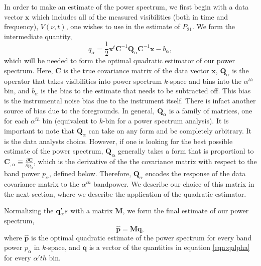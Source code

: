 \documentclass[twocolumn,numberedappendix]{emulateapj} \shorttitle{PSA64}
\newcommand{\x}{\mathbf{x}} \newcommand{\xhat}{\hat{\mathbf{x}}}
\begin{document}
In order to make an estimate of the power spectrum, we first begin with a data
vector $\x$ which includes all of the measured  visibilities (both in time and
frequency), $V(\nu,t)$, one wishes to use in the estimate of $P_{21}$. We form
the intermediate quantity,
\begin{equation}
\label{eqn:qalpha}
    q_{\alpha} = \frac{1}{2}\x^{t}\mathbf{C}^{-1}\mathbf{Q}_{\alpha}\mathbf{C}^{-1}\x - b_{\alpha},
\end{equation}
which will be needed to form the optimal quadratic estimator of our power spectrum.
Here, $\mathbf{C}$ is the true covariance matrix of the data vector $\x$, 
$\mathbf{Q}_{\alpha}$ is the operator that takes visibilities into power spectrum
$k$-space and bins into the ${\alpha}^{th}$ bin, and $b_{\alpha}$ is the bias to
the estimate that needs to be subtracted off. This bias is the instrumental
noise bias due to the instrument itself. There is infact another source of bias
due to the foregrounds. In general, $\mathbf{Q}_{\alpha}$
is a family of matrices, one for each $\alpha^{th}$ bin (equivalent to $k$-bin
for a power spectrum analysis). It is important to note that
$\mathbf{Q}_{\alpha}$ can take on any form and be completely arbitrary. It is
the data analysts choice. However, if one is looking for the best possible
estimate of the power spectrum,  $\mathbf{Q_{\alpha}}$ generally
takes a form that is proportionl to  $\mathbf{C}_{,\alpha} \equiv
\frac{\partial{\mathbf{C}}}{\partial p_{\alpha}}$, which is the derivative of
the the covariance matrix with respect to the band power $p_{\alpha}$, defined
below.  Therefore, $\mathbf{Q}_{\alpha}$ encodes the response of the data
covariance matrix to the $\alpha^{th}$ bandpower. We describe our choice of this
matrix in the next section, where we describe the application of the quadratic
estimator. 

Normalizing the $\mathbf{q}_{\alpha}'s$ with a matrix $\mathbf{M}$, we form
the final estimate of our power spectrum,
\begin{equation}\label{eqn:pspec_norm}
    \mathbf{\hat{p}} = \mathbf{M}\mathbf{q},
\end{equation}
where $\mathbf{\hat{p}}$ is the optimal quadratic estimate of the power spectrum
for every band power $p_{\alpha}$ in $k$-space, and $\mathbf{q}$ is a vector of the
quantities in equation \ref{eqn:qalpha} for every $\alpha'th$ bin.
\end{document}
